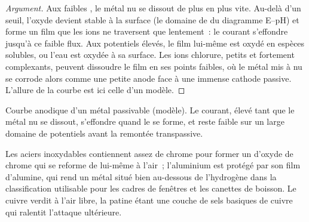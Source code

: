 \begin{proof}[Argument]
Aux faibles , le métal nu se dissout de plus en plus vite. Au-delà d'un
seuil, l'oxyde devient stable à la surface (le domaine de  du
diagramme E--pH) et forme un film que les ions ne traversent que lentement~: le
courant s'effondre jusqu'à ce faible flux. Aux potentiels élevés, le film lui-même est
oxydé en espèces solubles, ou l'eau est oxydée à sa surface. Les ions chlorure, petits
et fortement complexants, peuvent dissoudre le film en ses points faibles, où le métal
mis à nu se corrode alors comme une petite anode face à une immense cathode passive. L'allure
de la courbe est ici celle d'un modèle.
\end{proof}

\begin{omfigure}

{\small Courbe anodique d'un métal passivable (modèle). Le courant, élevé tant que
le métal nu se dissout, s'effondre quand le  se forme, et reste
faible sur un large domaine de potentiels avant la remontée transpassive.}
\end{omfigure}

Les aciers inoxydables contiennent assez de chrome pour former un  d'oxyde de chrome
qui se reforme de lui-même à l'air~; l'aluminium est protégé par son film d'alumine, qui
rend un métal situé bien au-dessous de l'hydrogène dans la classification utilisable pour les cadres de fenêtres et
les canettes de boisson. Le cuivre verdit à l'air libre, la patine étant une couche de
sels basiques de cuivre qui ralentit l'attaque ultérieure.

